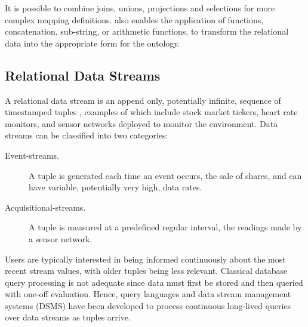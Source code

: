 It is possible to combine joins, unions, projections and selections for more complex mapping definitions.
\rtwoo also enables the application of functions, \eg concatenation, sub-string, or arithmetic functions, to transform the relational data into the appropriate form for the ontology.



\subsection{Relational Data Streams}
\label{sec:query-relat-streams}

A relational data stream is an append only, potentially infinite, sequence of timestamped tuples \cite{Golab2003Issues-in-data-}, examples of which include stock market tickers, heart rate monitors, and sensor networks deployed to monitor the environment.
Data streams can be classified into two categories:
\begin{description}
\item[Event-streams.] A tuple is generated each time an event occurs, \eg the sale of shares, and can have variable, potentially very high, data rates.
\item[Acquisitional-streams.] A tuple is measured at a predefined regular interval, \eg the readings made by a sensor network.
\end{description}
Users are typically interested in being informed continuously about the most recent stream values, with older tuples being less relevant.
Classical database query processing is not adequate since data must first be stored and then queried with one-off evaluation.
Hence, query languages \cite{Brenninkmeijer_08,Arasu_2006} and data stream management systems (DSMS) \cite{Arasu_06a,Abadi_2005,Galpin_09,Madden_05} have been developed to process continuous long-lived queries over data streams as tuples arrive.

